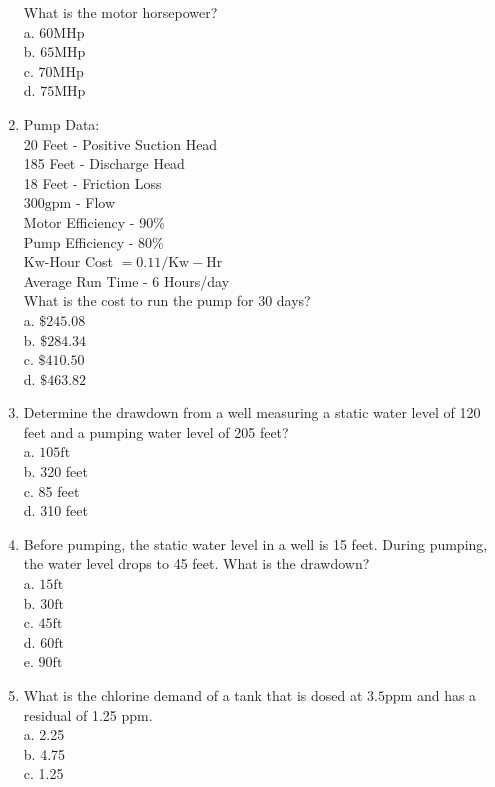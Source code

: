 \begin{enumerate}
What is the motor horsepower?\\
a. $60 \mathrm{MHp}$\\
b. $65 \mathrm{MHp}$\\
c. $70 \mathrm{MHp}$\\
d. $75 \mathrm{MHp}$\\
\item Pump Data:\\
20 Feet - Positive Suction Head\\
185 Feet - Discharge Head\\
18 Feet - Friction Loss\\
$300 \mathrm{gpm}$ - Flow\\
Motor Efficiency - 90\%\\
Pump Efficiency - 80\%\\
$\mathrm{Kw}$-Hour Cost $=0.11 / \mathrm{Kw}-\mathrm{Hr}$\\
Average Run Time - 6 Hours/day\\
What is the cost to run the pump for 30 days?\\
a. $\$ 245.08$\\
b. $\$ 284.34$\\
c. $\$ 410.50$\\
d. $\$ 463.82$\\
\item Determine the drawdown from a well measuring a static water level of 120 feet and a pumping water level of 205 feet?\\
a. $105 \mathrm{ft}$\\
b. 320 feet\\
c. 85 feet\\
d. 310 feet\\
\item Before pumping, the static water level in a well is 15 feet. During pumping, the water level drops to 45 feet. What is the drawdown?\\
a. $15 \mathrm{ft}$\\
b. $30 \mathrm{ft}$\\
c. $45 \mathrm{ft}$\\
d. $60 \mathrm{ft}$\\
e. $90 \mathrm{ft}$\\
\item What is the chlorine demand of a tank that is dosed at $3.5 \mathrm{ppm}$ and has a residual of 1.25 ppm.\\
a. 2.25\\
b. 4.75\\
c. 1.25\\

\end{enumerate}
